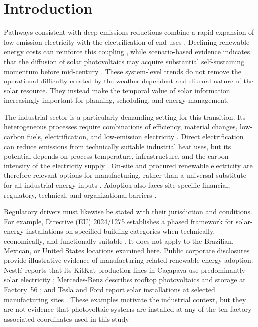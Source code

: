 \section{Introduction}
\label{sec:introduction}

Pathways consistent with deep emissions reductions combine a rapid expansion
of low-emission electricity with the electrification of end uses
\cite{ipcc2022energy,irena2024weto}. Declining renewable-energy costs can
reinforce this coupling \cite{luderer2022}, while scenario-based evidence
indicates that the diffusion of solar photovoltaics may acquire substantial
self-sustaining momentum before mid-century \cite{nijsse2023}. These
system-level trends do not remove the operational difficulty created by the
weather-dependent and diurnal nature of the solar resource. They instead make
the temporal value of solar information increasingly important for planning,
scheduling, and energy management.

The industrial sector is a particularly demanding setting for this transition.
Its heterogeneous processes require combinations of efficiency, material
changes, low-carbon fuels, electrification, and low-emission electricity
\cite{ipcc2022industry,rissman2020}. Direct electrification can reduce
emissions from technically suitable industrial heat uses, but its potential
depends on process temperature, infrastructure, and the carbon intensity of
the electricity supply \cite{madeddu2020}. On-site and procured renewable
electricity are therefore relevant options for manufacturing, rather than a
universal substitute for all industrial energy inputs
\cite{irena2014manufacturing,padmanathan2018}. Adoption also faces
site-specific financial, regulatory, technical, and organizational barriers
\cite{dhingra2023}.

Regulatory drivers must likewise be stated with their jurisdiction and
conditions. For example, Directive (EU) 2024/1275 establishes a phased
framework for solar-energy installations on specified building categories
when technically, economically, and functionally suitable
\cite{eu2024epbd}. It does not apply to the Brazilian, Mexican, or United
States locations examined here. Public corporate disclosures provide
illustrative evidence of manufacturing-related renewable-energy adoption:
Nestl\'e reports that its KitKat production lines in Ca\c{c}apava use
predominantly solar electricity \cite{nestle2024biometano}; Mercedes-Benz
describes rooftop photovoltaics and storage at Factory~56
\cite{mercedesfactory56}; and Tesla and Ford report solar installations at
selected manufacturing sites \cite{tesla2021impact,ford2023valencia}. These
examples motivate the industrial context, but they are not evidence that
photovoltaic systems are installed at any of the ten factory-associated
coordinates used in this study.

